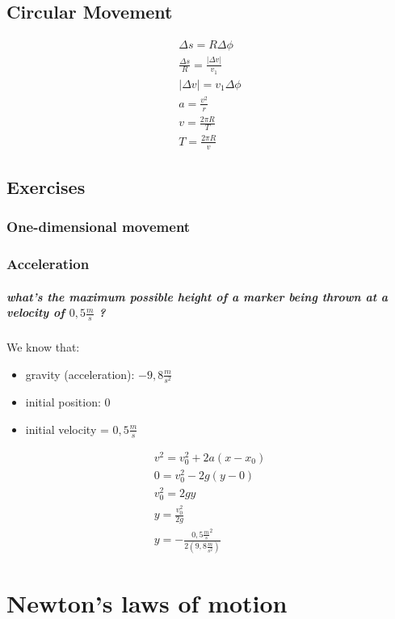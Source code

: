 \documentclass[11pt,fleqn]{book} %
\begin{document}
\section*{Circular Movement}

\begin{gather}
    \Delta s = R \Delta \phi \\ 
    \frac{\Delta s}{R} = \frac{|\Delta v|}{v_1} \\
    |\Delta v| = v_1 \Delta \phi \\
    a = \frac{v^2}{r} \\
    v = \frac{2 \pi R}{T} \\
    T = \frac{2 \pi R}{v}
\end{gather}

\section{Exercises}
\subsection*{One-dimensional movement}


\subsection{Acceleration}
\paragraph{what's the maximum possible height of a marker being thrown at a
velocity of $ 0,5 \frac{m}{s}$ ?}

We know that:
\begin{itemize}
    \item gravity (acceleration): $ -9,8 \frac{m}{s^2} $
    \item initial position: 0
    \item initial velocity = $ 0,5 \frac{m}{s} $
\end{itemize}

\begin{gather}
    v^2 = v^2_0 + 2a(x-x_0) \\
    0 = v_0^2 - 2g(y-0) \\
    v_0^2 = 2gy \\
    y = \frac{v_0^2}{2g} \\ 
    y = - \frac{0,5\frac{m}{s}^2}{2(9,8\frac{m}{s^2})}
\end{gather}


\chapter{Newton's laws of motion}
\end{document}
